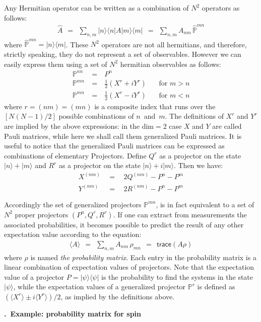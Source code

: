 \documentclass[onecolumn,fleqn, 11pt]{revtex4}
\newcommand{\trc}{\mathsf{trace}}
\newcommand{\beq}{\begin{eqnarray}}
\newcommand{\eeq}{\end{eqnarray}}
\renewcommand{\thesubsection}{\arabic{subsection}}
\renewcommand{\thesubsubsection}{\arabic{subsubsection}}
\newcommand{\sheadC}[1]
{
\addtocounter{subsubsection}{1}
\vspace{5mm}
{\bf \thesubsection.\thesubsubsection \ #1}  
\nopagebreak
\phantomsection
}
\begin{document}
Any Hermitian operator can be written 
as a combination of ${N^2}$ operators 
as follows:
\beq
\hat{A} \ \ = \ \ \sum_{n,m} |n \rangle \langle n|A|m \rangle \langle m| 
\ \ = \ \ \sum_{n,m}A_{nm} \, \hat{\mathbb{P}}^{mn} 
\eeq
where ${\hat{\mathbb{P}}^{mn} = |n \rangle \langle m|}$. 
These $N^2$ operators are not all hermitians, 
and therefore, strictly speaking, they do not represent a set of observables.  
However we can easily express them using a set of $N^2$ hermitian 
observables as follows:
\beq
\mathbb{P}^{nn} & \ = \ &  P^{n}   \\
\mathbb{P}^{mn} & \ = \ &  \frac{1}{2}(X^{r} + iY^{r})  \ \ \ \ \ \ \ \  \mbox{for $m{>}n$} \\
\mathbb{P}^{mn} & \ = \ &  \frac{1}{2}(X^{r} - iY^{r})  \ \ \ \  \ \ \ \ \mbox{for $m{<}n$} 
\eeq
where $r=(nm)=(mn)$ is a composite index that runs over 
the $[N(N{-}1)/2]$ possible combinations of $n$~and~$m$. 
The definitions of $X^{r}$ and $Y^{r}$ are 
implied by the above expressions:
in the dim$=2$ case $X$ and $Y$ are called Pauli matrices, 
while here we shall call them generalized Pauli matrices. 
It is useful to notice that the generalized Pauli matrices
can be expressed as combinations of elementary Projectors. 
Define $Q^{r}$ as a projector on the state  ${|n\rangle+|m\rangle}$
and $R^{r}$ as a projector on the state ${|n\rangle+i|m\rangle}$.
Then we have:
\beq
X^{(nm)} \ \ &=& \ \ 2Q^{(nm)}-P^{n}-P^{m} \\
Y^{(nm)} \ \ &=& \ \ 2R^{(nm)}-P^{n}-P^{m}
\eeq

Accordingly the set of generalized projectors ${\mathbb{P}}^{mn}$, 
is in fact equivalent to a set of $N^2$ 
proper projectors ${(P^{n},Q^{r},R^{r})}$.   
If one can extract from measurements the associated probabilities, 
it becomes possible to predict the result of any other expectation value  
according to the equation:
\beq
\langle A \rangle \ \ =  \ \ \sum_{n,m}A_{nm} \, \rho_{mn} \ \ = \ \ \trc(A\rho) 
\eeq
where ${\rho}$ is named {\em the probability matrix}. Each entry in the probability 
matrix is a linear combination of expectation values of projectors.  
Note that the expectation value of a projector $P=|\psi\rangle\langle\psi|$ 
is the probability to find the systems in the state $|\psi\rangle$, 
while the expectation values of a generalized projector $\mathbb{P}^{r}$ 
is defined as $(\langle X^{r} \rangle \pm i \langle Y^{r}\rangle )/2$, 
as implied by the definitions above. 


 
\sheadC{Example: probability matrix for spin}
\end{document}
